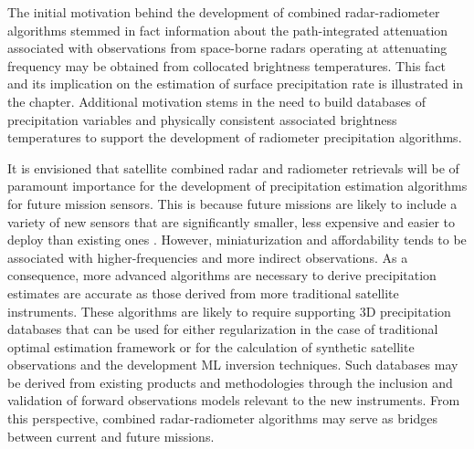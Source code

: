 \documentclass[10pt]{ietbook}
\begin{document}
The initial motivation behind the development of combined radar-radiometer algorithms stemmed in fact information about the path-integrated attenuation associated with
observations from space-borne radars operating at attenuating frequency may be obtained from collocated brightness temperatures.  This fact and its implication on
the estimation of surface precipitation rate is illustrated in the chapter.  Additional motivation stems in the need to build databases of precipitation variables and
physically consistent associated brightness temperatures to support the development of radiometer precipitation algorithms.

It is envisioned that satellite combined radar and radiometer retrievals will be of paramount importance for the development of precipitation estimation algorithms
for future mission sensors.  This is because future missions are likely to include a variety of new sensors that are 
significantly smaller, less expensive and easier to deploy than existing ones \cite{raincube2019,tropics2018,gong2021}. However,
miniaturization and affordability tends to be associated with higher-frequencies and more indirect observations.  As a consequence,
more advanced algorithms are necessary to derive precipitation estimates are accurate as those derived from more
traditional satellite instruments. These algorithms are likely to require supporting 3D precipitation databases that can be used
for either regularization in the case of traditional optimal estimation framework or for the calculation of synthetic satellite
observations and the development ML inversion techniques.  Such databases may be derived from existing products and methodologies
through the inclusion and validation of forward observations models relevant to the new instruments.  From this perspective,
combined radar-radiometer algorithms may serve as bridges between current and future missions.









 
\end{document}
